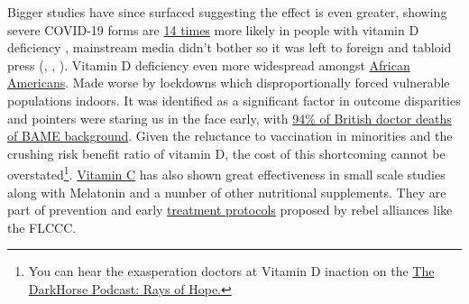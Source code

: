 \documentclass[11pt,a4paper,notitlepage]{report}
\begin{document}
Bigger studies have since surfaced suggesting the effect is even greater, showing severe COVID-19 forms are \href{https://journals.plos.org/plosone/article?id=10.1371/journal.pone.0263069}{14 times} more likely in people with vitamin D deficiency \cite{10.1371/journal.pone.0263069}, mainstream media didn't bother so it was left to foreign and tabloid press (\cite{timesofisrael03022022}, \cite{dailymail08022022}, \cite{hindustantimes14022022}). Vitamin D deficiency even more widespread amongst \href{https://www.everydayhealth.com/vitamin-d/does-vitamin-d-deficiency-pose-a-special-risk-for-black-people}{African Americans}. Made worse by lockdowns which disproportionally forced vulnerable populations indoors. It was identified as a significant factor in outcome disparities \cite{Ames2021-sf} and pointers were staring us in the face early, with \href{https://twitter.com/TheBMA/status/1271768163630428160?s=20}{94\% of British doctor deaths of BAME background}. Given the reluctance to vaccination in minorities and the crushing risk benefit ratio of vitamin D, the cost of this shortcoming cannot be overstated\footnote{You can hear the exasperation doctors at Vitamin D inaction on the \href{https://open.spotify.com/episode/4BXJgl3LYVez6CrDTbkwOl?si=SYGoeHpzT36LSOsEaQ4jXg}{The DarkHorse Podcast: Rays of Hope.}}. \href{https://nutritionj.biomedcentral.com/articles/10.1186/s12937-021-00727-z}{Vitamin C} has also shown great effectiveness in small scale studies \cite{irriguible2021} along with Melatonin \cite{Cross2021-bl} and a number of other nutritional supplements. They are part of prevention and early \href{https://covid19criticalcare.com/wp-content/uploads/2020/11/FLCCC-Alliance-I-MASKplus-Protocol-ENGLISH.pdf}{treatment protocols} \cite{flccc-imask} proposed by rebel alliances like the FLCCC.






\end{document}

